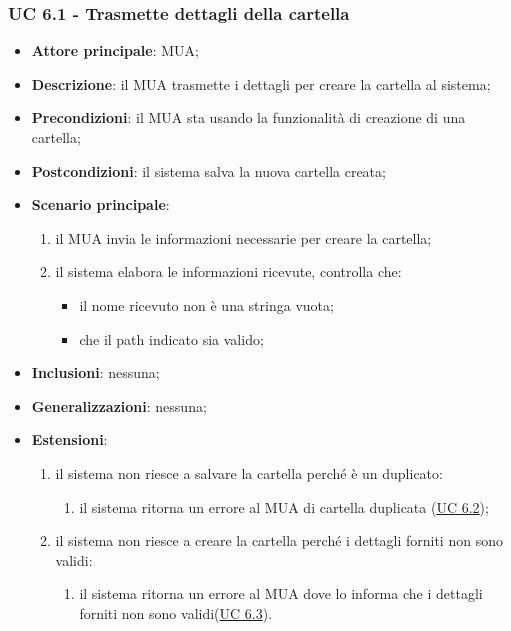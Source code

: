 \subsubsection{UC 6.1 - Trasmette dettagli della cartella} \label{sec:UC6.1}
    \begin{itemize}
        \item \textbf{Attore principale}: MUA;
        \item \textbf{Descrizione}: il MUA trasmette i dettagli per creare la cartella al sistema;
        \item \textbf{Precondizioni}: il MUA sta usando la funzionalità di creazione di una cartella;
        \item \textbf{Postcondizioni}: il sistema salva la nuova cartella creata;
        \item \textbf{Scenario principale}:
            \begin{enumerate}
                \item il MUA invia le informazioni necessarie per creare la cartella;
                \item il sistema elabora le informazioni ricevute, controlla che:
                \begin{itemize}
                    \item il nome ricevuto non è una stringa vuota;
                    \item che il path indicato sia valido;
                \end{itemize}
            \end{enumerate}
        \item \textbf{Inclusioni}: nessuna;
        \item \textbf{Generalizzazioni}: nessuna;
        \item \textbf{Estensioni}:
            \begin{enumerate}[label=\alph*.]
                \item il sistema non riesce a salvare la cartella perché è un duplicato:
                \begin{enumerate}[label=\arabic*.]
                    \item il sistema ritorna un errore al MUA di cartella duplicata (\hyperref[sec:UC6.2]{UC 6.2});
                \end{enumerate}
                \item il sistema non riesce a creare la cartella perché i dettagli forniti non sono validi:
                \begin{enumerate}[label=\arabic*.]
                    \item il sistema ritorna un errore al MUA dove lo informa che i dettagli forniti non sono validi(\hyperref[sec:UC6.3]{UC 6.3}).
                \end{enumerate}
            \end{enumerate}
    \end{itemize}

